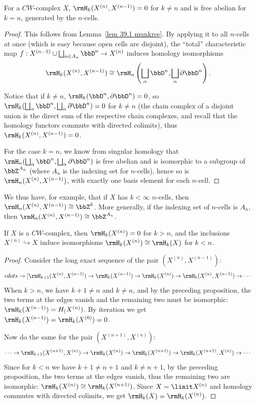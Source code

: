 \begin{prop}
    For a $CW$-complex $X$, $\rmH_k(X^{(n)},X^{(n-1)})=0$ for $k\neq n$ and is free abelian for $k=n$, generated by the $n$-cells.
\end{prop}
\begin{proof}
    This follows from Lemma~\ref{lem 39.1 munkres}. By applying it to all $n$-cells at once (which is easy because open cells are disjoint), the ``total'' characteristic map $f:X^{(n-1)}\cup \bigsqcup_{\alpha\in A_n} \bbD^n\to X^{(n)}$ induces homology isomorphisms
    \[\rmH_k(X^{(n)},X^{(n-1)})\cong \rmH_n\left(\bigsqcup_\alpha \bbD^n,\bigsqcup_\alpha \partial \bbD^n\right).\]
    
    Notice that if $k\neq n$, $\rmH_k(\bbD^n,\partial \bbD^n)=0$, so $\rmH_k(\bigsqcup_\alpha \bbD^n,\bigsqcup_\alpha \partial \bbD^n)=0$ for $k\neq n$ (the chain complex of a disjoint union is the direct sum of the respective chain complexes, and recall that the homology functors commute with directed colimits), thus $\rmH_k(X^{(n)},X^{(n-1)})=0$.

    For the case $k=n$, we know from singular homology that $\rmH_n(\bigsqcup_\alpha \bbD^n,\bigsqcup_\alpha \partial \bbD^n)$ is free abelian and is isomorphic to a subgroup of $\bbZ^{A_n}$ (where $A_n$ is the indexing set for $n$-cells), hence so is $\rmH_n(X^{(n)},X^{(n-1)})$, with exactly one basis element for each $n$-cell.
\end{proof}

We thus have, for example, that if $X$ has $k<\infty$ $n$-cells, then $\rmH_n(X^{(n)},X^{(n-1)})\cong \bbZ^k$. More generally, if the indexing set of $n$-cells is $A_n$, then $\rmH_n(X^{(n)},X^{(n-1)})\cong\bbZ^{A_n}$.

\begin{prop}
    If $X$ is a $CW$-complex, then $\rmH_k(X^{(n)})=0$ for $k>n$, and the inclusions $X^{(n)}\hookrightarrow X$ induce isomorphisms $\rmH_k(X^{(n)})\cong \rmH_k(X)$ for $k<n$.
\end{prop}
\begin{proof}
    Consider the long exact sequence of the pair $(X^{(n)},X^{(n-1)})$:
    \[cdots\to [\rmH_{k+1}(X^{(n)},X^{(n-1)})\to \rmH_k(X^{(n-1)})\to \rmH_k(X^{(n)})\to \rmH_k(X^{(n)},X^{(n-1)})\to\cdots \]
    When $k>n$, we have $k+1\neq n$ and $k\neq n$, and by the preceding proposition, the two terms at the edges vanish and the remaining two must be isomorphic: $\rmH_k(X^{(n-1)})=H_(X^{(n)})$. By iteration we get $\rmH_k(X^{(n-1)})=\rmH_k(X^{(0)})=0$.
    
    Now do the same for the pair $(X^{(n+1)},X^{(n)})$:
    \[\cdots\to \rmH_{k+1}(X^{(n+1)},X^{(n)})\to \rmH_k(X^{(n)})\to \rmH_k(X^{(n+1)})\to \rmH_k(X^{(n+1)},X^{(n)})\to\cdots \]
    Since for $k<n$ we have $k+1\neq n+1$ and $k\neq n+1$, by the preceding proposition, the two terms at the edges vanish, thus the remaining two are isomorphic: $\rmH_k(X^{(n)})\cong \rmH_k(X^{(n+1)})$. Since $X=\limit X^{(n)}$ and homology commutes with directed colimits, we get $\rmH_k(X)=\rmH_k(X^{(n)})$.
\end{proof}

